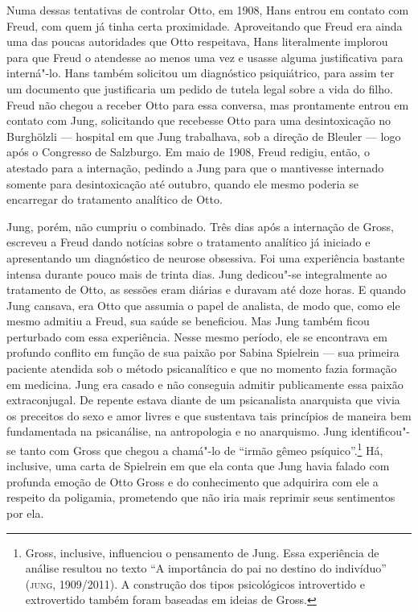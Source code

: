 Numa dessas tentativas de controlar Otto, em 1908, Hans entrou em
contato com Freud, com quem já tinha certa proximidade. Aproveitando que
Freud era ainda uma das poucas autoridades que Otto respeitava, Hans
literalmente implorou para que Freud o atendesse ao menos uma vez e
usasse alguma justificativa para interná"-lo. Hans também solicitou um
diagnóstico psiquiátrico, para assim ter um documento que justificaria
um pedido de tutela legal sobre a vida do filho. Freud não chegou a
receber Otto para essa conversa, mas prontamente entrou em contato com
Jung, solicitando que recebesse Otto para uma desintoxicação no
Burghölzli --- hospital em que Jung trabalhava, sob a direção de Bleuler
--- logo após o Congresso de Salzburgo. Em maio de 1908, Freud redigiu,
então, o atestado para a internação, pedindo a Jung para que o
mantivesse internado somente para desintoxicação até outubro, quando ele
mesmo poderia se encarregar do tratamento analítico de Otto.

Jung, porém, não cumpriu o combinado. Três dias após a internação de
Gross, escreveu a Freud dando notícias sobre o tratamento analítico já
iniciado e apresentando um diagnóstico de neurose obsessiva. Foi uma
experiência bastante intensa durante pouco mais de trinta dias. Jung
dedicou"-se integralmente ao tratamento de Otto, as sessões eram diárias
e duravam até doze horas. E quando Jung cansava, era Otto que assumia o
papel de analista, de modo que, como ele mesmo admitiu a Freud, sua
saúde se beneficiou. Mas Jung também ficou perturbado com essa
experiência. Nesse mesmo período, ele se encontrava em profundo conflito
em função de sua paixão por Sabina Spielrein --- sua primeira paciente
atendida sob o método psicanalítico e que no momento fazia formação em
medicina. Jung era casado e não conseguia admitir publicamente essa
paixão extraconjugal. De repente estava diante de um psicanalista
anarquista que vivia os preceitos do sexo e amor livres e que sustentava
tais princípios de maneira bem fundamentada na psicanálise, na
antropologia e no anarquismo. Jung identificou"-se tanto com Gross que
chegou a chamá"-lo de ``irmão gêmeo psíquico''.\footnote{Gross, inclusive,
  influenciou o pensamento de Jung. Essa experiência de análise resultou
  no texto ``A importância do pai no destino do indivíduo'' (\textsc{jung}, 1909/2011). A
  construção dos tipos psicológicos introvertido e extrovertido também
  foram baseadas em ideias de Gross.} Há, inclusive, uma carta de
Spielrein em que ela conta que Jung havia falado com profunda emoção de
Otto Gross e do conhecimento que adquirira com ele a respeito da
poligamia, prometendo que não iria mais reprimir seus sentimentos por
ela.

